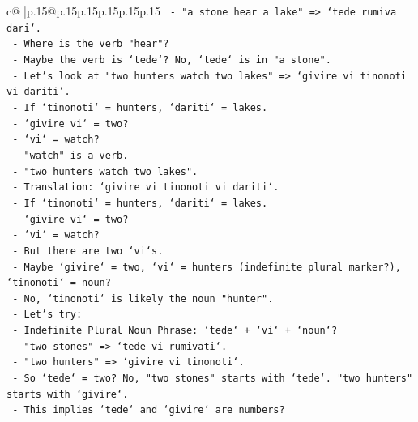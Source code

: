 \documentclass{article}
\begin{document}
{\begin{supertabular}{c@{$\;$}|p{.15\linewidth}@{}p{.15\linewidth}p{.15\linewidth}p{.15\linewidth}p{.15\linewidth}p{.15\linewidth}}
{{{\texttt{                         {-} "a stone hear a lake" => `tede rumiva dari`.} \\
\texttt{                         {-} Where is the verb "hear"?} \\
\texttt{                         {-} Maybe the verb is `tede`? No, `tede` is in "a stone".} \\
\texttt{                         {-} Let's look at "two hunters watch two lakes" => `givire vi tinonoti vi dariti`.} \\
\texttt{                           {-} If `tinonoti` = hunters, `dariti` = lakes.} \\
\texttt{                           {-} `givire vi` = two?} \\
\texttt{                           {-} `vi` = watch?} \\
\texttt{                           {-} "watch" is a verb.} \\
\texttt{                           {-} "two hunters watch two lakes".} \\
\texttt{                           {-} Translation: `givire vi tinonoti vi dariti`.} \\
\texttt{                           {-} If `tinonoti` = hunters, `dariti` = lakes.} \\
\texttt{                           {-} `givire vi` = two?} \\
\texttt{                           {-} `vi` = watch?} \\
\texttt{                           {-} But there are two `vi`s.} \\
\texttt{                           {-} Maybe `givire` = two, `vi` = hunters (indefinite plural marker?), `tinonoti` = noun?} \\
\texttt{                           {-} No, `tinonoti` is likely the noun "hunter".} \\
\texttt{                           {-} Let's try:} \\
\texttt{                             {-} Indefinite Plural Noun Phrase: `tede` + `vi` + `noun`?} \\
\texttt{                             {-} "two stones" => `tede vi rumivati`.} \\
\texttt{                             {-} "two hunters" => `givire vi tinonoti`.} \\
\texttt{                             {-} So `tede` = two? No, "two stones" starts with `tede`. "two hunters" starts with `givire`.} \\
\texttt{                             {-} This implies `tede` and `givire` are numbers?} \\
}}}
\end{supertabular}}
\end{document}
